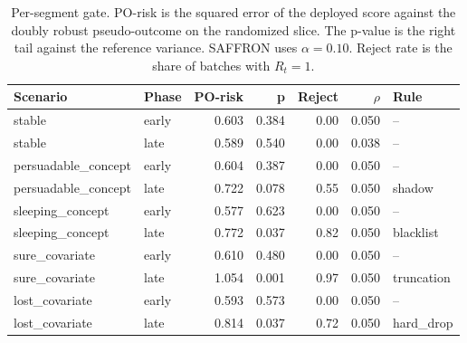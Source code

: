 \begin{table}[t]
\centering
\caption{Per-segment gate. PO-risk is the squared error of the deployed score against the doubly robust pseudo-outcome on the randomized slice. The p-value is the right tail against the reference variance. SAFFRON uses $\alpha=0.10$. Reject rate is the share of batches with $R_t=1$.}
\label{tab:quadrant-gate}
\begin{tabular}{llrrrrl}
\toprule
Scenario & Phase & PO-risk & p & Reject & $\rho$ & Rule \\
\midrule
stable & early & 0.603 & 0.384 & 0.00 & 0.050 & -- \\
stable & late & 0.589 & 0.540 & 0.00 & 0.038 & -- \\
persuadable_concept & early & 0.604 & 0.387 & 0.00 & 0.050 & -- \\
persuadable_concept & late & 0.722 & 0.078 & 0.55 & 0.050 & shadow \\
sleeping_concept & early & 0.577 & 0.623 & 0.00 & 0.050 & -- \\
sleeping_concept & late & 0.772 & 0.037 & 0.82 & 0.050 & blacklist \\
sure_covariate & early & 0.610 & 0.480 & 0.00 & 0.050 & -- \\
sure_covariate & late & 1.054 & 0.001 & 0.97 & 0.050 & truncation \\
lost_covariate & early & 0.593 & 0.573 & 0.00 & 0.050 & -- \\
lost_covariate & late & 0.814 & 0.037 & 0.72 & 0.050 & hard_drop \\
\bottomrule
\end{tabular}
\end{table}

